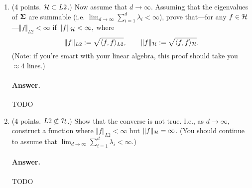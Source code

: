 \documentclass[11pt,letterpaper]{article}
\newenvironment{answer}{%
    \vspace{1em}
    \color{black}
    \paragraph{Answer.}
  }{%
    \vspace{1em}
  }
\begin{document}
\begin{enumerate}
\begin{answer}
  TODO
\end{answer}



\begin{answer}
  TODO
\end{answer}


  \item (4 points. $\mathcal{H} \subset L2$.)
    Now assume that $d \to \infty$.
    Assuming that the eigenvalues of ${\bm{\Sigma}}$ are summable (i.e. $\lim_{d \to \infty} \sum_{i=1}^d \lambda_i < \infty$),
    prove that---for any $f \in \mathcal{H}$---$\Vert f \Vert_{L2} < \infty$ if $\Vert f \Vert_{\mathcal{H}} < \infty,$ where
    $$\Vert f \Vert_{L2} := \sqrt{\langle f, f \rangle_{L2}}, \qquad \Vert f \Vert_{\mathcal{H}} := \sqrt{\langle f, f \rangle_{\mathcal{H}}}. $$
    (Note: if you're smart with your linear algebra, this proof should take you $\approx 4$ lines.)

\begin{answer}
  TODO
\end{answer}

  \item (4 points. $L2 \not\subset \mathcal{H}$.)
    Show that the converse is not true.
    I.e., as $d \to \infty$, construct a function where $\Vert f \Vert_{L2} < \infty$ but $\Vert f \Vert_{\mathcal{H}} = \infty$.
    (You should continue to assume that $\lim_{d \to \infty} \sum_{i=1}^d \lambda_i < \infty$.)

\begin{answer}
  TODO
\end{answer}
\end{enumerate}
\end{document}
